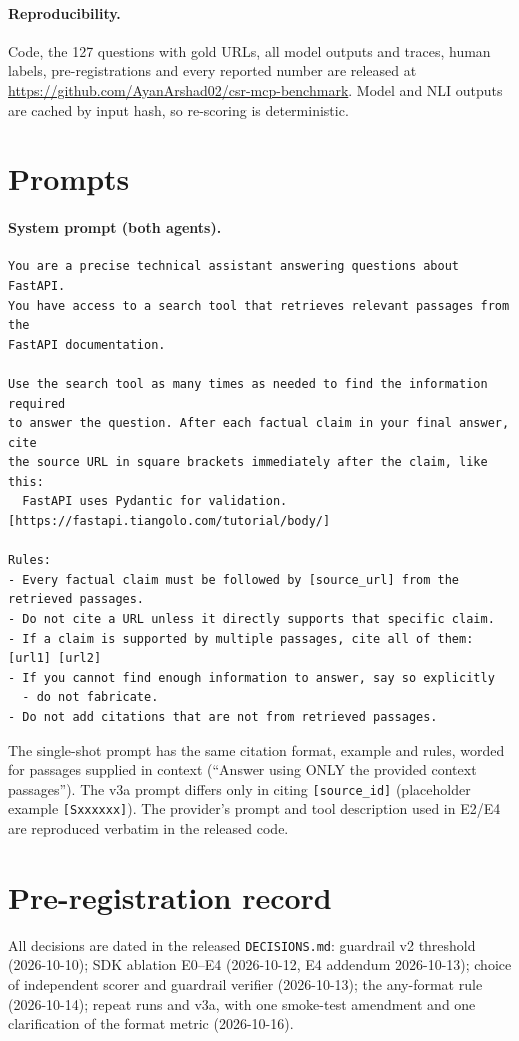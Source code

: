 \documentclass[11pt]{article}
\newcommand{\code}[1]{\texttt{#1}}
\begin{document}
\paragraph{Reproducibility.} Code, the 127 questions with gold URLs, all model outputs and traces,
human labels, pre-registrations and every reported number are released at
\url{https://github.com/AyanArshad02/csr-mcp-benchmark}. Model and NLI outputs are cached by
input hash, so re-scoring is deterministic.




\appendix
\section{Prompts}
\label{app:prompts}

\paragraph{System prompt (both agents).}
\begin{small}
\begin{verbatim}
You are a precise technical assistant answering questions about FastAPI.
You have access to a search tool that retrieves relevant passages from the
FastAPI documentation.

Use the search tool as many times as needed to find the information required
to answer the question. After each factual claim in your final answer, cite
the source URL in square brackets immediately after the claim, like this:
  FastAPI uses Pydantic for validation. [https://fastapi.tiangolo.com/tutorial/body/]

Rules:
- Every factual claim must be followed by [source_url] from the retrieved passages.
- Do not cite a URL unless it directly supports that specific claim.
- If a claim is supported by multiple passages, cite all of them: [url1] [url2]
- If you cannot find enough information to answer, say so explicitly
  - do not fabricate.
- Do not add citations that are not from retrieved passages.
\end{verbatim}
\end{small}
The single-shot prompt has the same citation format, example and rules, worded for passages
supplied in context (``Answer using ONLY the provided context passages''). The v3a prompt differs only in citing \code{[source\_id]}
(placeholder example \code{[Sxxxxxx]}). The provider's prompt and tool description used in E2/E4
are reproduced verbatim in the released code.

\section{Pre-registration record}
All decisions are dated in the released \code{DECISIONS.md}: guardrail v2 threshold (2026-10-10);
SDK ablation E0--E4 (2026-10-12, E4 addendum 2026-10-13); choice of independent scorer and
guardrail verifier (2026-10-13); the any-format rule (2026-10-14); repeat runs and v3a, with one
smoke-test amendment and one clarification of the format metric (2026-10-16).
\end{document}
